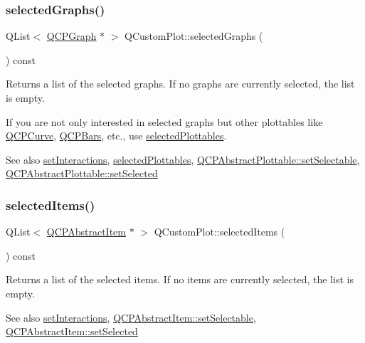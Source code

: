 \subsubsection{\texorpdfstring{selected\+Graphs()}{selectedGraphs()}}
{\footnotesize\ttfamily Q\+List$<$ \mbox{\hyperlink{class_q_c_p_graph}{Q\+C\+P\+Graph}} $\ast$ $>$ Q\+Custom\+Plot\+::selected\+Graphs (\begin{DoxyParamCaption}{ }\end{DoxyParamCaption}) const}

Returns a list of the selected graphs. If no graphs are currently selected, the list is empty.

If you are not only interested in selected graphs but other plottables like \mbox{\hyperlink{class_q_c_p_curve}{Q\+C\+P\+Curve}}, \mbox{\hyperlink{class_q_c_p_bars}{Q\+C\+P\+Bars}}, etc., use \mbox{\hyperlink{class_q_custom_plot_a747faaab57c56891e901a1e97fa4359a}{selected\+Plottables}}.

\begin{DoxySeeAlso}{See also}
\mbox{\hyperlink{class_q_custom_plot_a5ee1e2f6ae27419deca53e75907c27e5}{set\+Interactions}}, \mbox{\hyperlink{class_q_custom_plot_a747faaab57c56891e901a1e97fa4359a}{selected\+Plottables}}, \mbox{\hyperlink{class_q_c_p_abstract_plottable_a22c69299eb5569e0f6bf084877a37dc4}{Q\+C\+P\+Abstract\+Plottable\+::set\+Selectable}}, \mbox{\hyperlink{class_q_c_p_abstract_plottable_afbd5428c2952f59d952e11ab5cd79176}{Q\+C\+P\+Abstract\+Plottable\+::set\+Selected}} 
\end{DoxySeeAlso}
\mbox{\label{class_q_custom_plot_afda487bcf2d6cf1a57173d82495e29ba}} 
\subsubsection{\texorpdfstring{selected\+Items()}{selectedItems()}}
{\footnotesize\ttfamily Q\+List$<$ \mbox{\hyperlink{class_q_c_p_abstract_item}{Q\+C\+P\+Abstract\+Item}} $\ast$ $>$ Q\+Custom\+Plot\+::selected\+Items (\begin{DoxyParamCaption}{ }\end{DoxyParamCaption}) const}

Returns a list of the selected items. If no items are currently selected, the list is empty.

\begin{DoxySeeAlso}{See also}
\mbox{\hyperlink{class_q_custom_plot_a5ee1e2f6ae27419deca53e75907c27e5}{set\+Interactions}}, \mbox{\hyperlink{class_q_c_p_abstract_item_a8a8e32a55bc478b849756a78c2d87fd2}{Q\+C\+P\+Abstract\+Item\+::set\+Selectable}}, \mbox{\hyperlink{class_q_c_p_abstract_item_a203de94ad586cc44d16c9565f49d3378}{Q\+C\+P\+Abstract\+Item\+::set\+Selected}} 
\end{DoxySeeAlso}
\mbox{\label{class_q_custom_plot_ac87624ddff1cbf4064781a8e8ae321c4}} 
